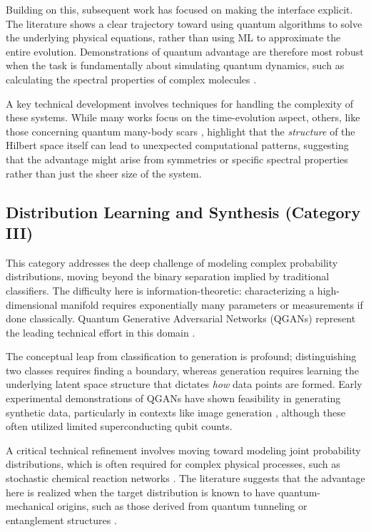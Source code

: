 \documentclass{article}
\begin{document}
Building on this, subsequent work has focused on making the interface explicit. The literature shows a clear trajectory toward using quantum algorithms to solve the underlying physical equations, rather than using ML to approximate the entire evolution. Demonstrations of quantum advantage are therefore most robust when the task is fundamentally about simulating quantum dynamics, such as calculating the spectral properties of complex molecules \cite{mensa2023quantum}.

A key technical development involves techniques for handling the complexity of these systems. While many works focus on the time-evolution aspect, others, like those concerning quantum many-body scars \cite{moudgalya2022quantum}, highlight that the \textit{structure} of the Hilbert space itself can lead to unexpected computational patterns, suggesting that the advantage might arise from symmetries or specific spectral properties rather than just the sheer size of the system.

\subsection{Distribution Learning and Synthesis (Category III)}

\label{sec:distribution\_learning\_and\_synthesis\_cate}

This category addresses the deep challenge of modeling complex probability distributions, moving beyond the binary separation implied by traditional classifiers. The difficulty here is information-theoretic: characterizing a high-dimensional manifold requires exponentially many parameters or measurements if done classically. Quantum Generative Adversarial Networks (QGANs) represent the leading technical effort in this domain \cite{li2020quantum}.

The conceptual leap from classification to generation is profound; distinguishing two classes requires finding a boundary, whereas generation requires learning the underlying latent space structure that dictates \textit{how} data points are formed. Early experimental demonstrations of QGANs have shown feasibility in generating synthetic data, particularly in contexts like image generation \cite{huang2021quantum}, although these often utilized limited superconducting qubit counts.

A critical technical refinement involves moving toward modeling joint probability distributions, which is often required for complex physical processes, such as stochastic chemical reaction networks \cite{mizuno2024finding}. The literature suggests that the advantage here is realized when the target distribution is known to have quantum-mechanical origins, such as those derived from quantum tunneling or entanglement structures \cite{zhou2022timestamp}.
\end{document}
